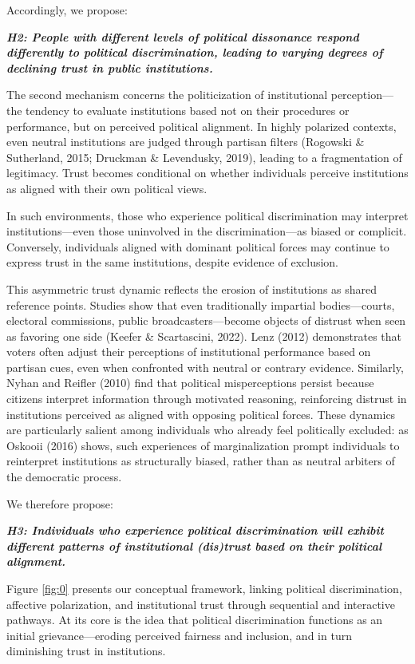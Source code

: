 \documentclass{article}
\begin{document}
Accordingly, we propose:

\emph{\textbf{\small
H2: People with different levels of political dissonance respond differently to political discrimination, leading to varying degrees of declining trust in public institutions.
}}

The second mechanism concerns the politicization of institutional perception—the tendency to evaluate institutions based not on their procedures or performance, but on perceived political alignment. In highly polarized contexts, even neutral institutions are judged through partisan filters (Rogowski \& Sutherland, 2015; Druckman \& Levendusky, 2019), leading to a fragmentation of legitimacy. Trust becomes conditional on whether individuals perceive institutions as aligned with their own political views.

In such environments, those who experience political discrimination may interpret institutions—even those uninvolved in the discrimination—as biased or complicit. Conversely, individuals aligned with dominant political forces may continue to express trust in the same institutions, despite evidence of exclusion.

This asymmetric trust dynamic reflects the erosion of institutions as shared reference points. Studies show that even traditionally impartial bodies—courts, electoral commissions, public broadcasters—become objects of distrust when seen as favoring one side (Keefer \& Scartascini, 2022). Lenz (2012) demonstrates that voters often adjust their perceptions of institutional performance based on partisan cues, even when confronted with neutral or contrary evidence. Similarly, Nyhan and Reifler (2010) find that political misperceptions persist because citizens interpret information through motivated reasoning, reinforcing distrust in institutions perceived as aligned with opposing political forces. These dynamics are particularly salient among individuals who already feel politically excluded: as Oskooii (2016) shows, such experiences of marginalization prompt individuals to reinterpret institutions as structurally biased, rather than as neutral arbiters of the democratic process. 

We therefore propose:

\emph{\textbf{\small
H3: Individuals who experience political discrimination will exhibit different patterns of institutional (dis)trust based on their political alignment.
}}

Figure \ref{fig:0} presents our conceptual framework, linking political discrimination, affective polarization, and institutional trust through sequential and interactive pathways. At its core is the idea that political discrimination functions as an initial grievance—eroding perceived fairness and inclusion, and in turn diminishing trust in institutions.
\end{document}
